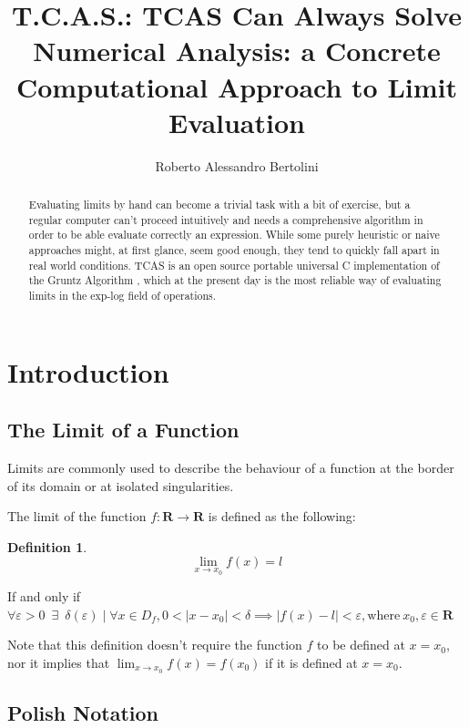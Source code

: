 \documentclass{article}
\title{\textbf{T.C.A.S.}: \textbf{T}CAS \textbf{C}an \textbf{A}lways \textbf{S}olve \\
	\large Numerical Analysis: a Concrete Computational Approach to Limit Evaluation}
\author{Roberto Alessandro Bertolini}
\date{}
\affil{Liceo Nervi Ferrari - Morbegno}
\theoremstyle{plain}
\theoremstyle{definition}
\newtheorem*{defn*}{Definition}
\theoremstyle{algorithm}
\begin{document}
	\maketitle
	
	\begin{abstract}
		Evaluating limits by hand can become a trivial task with a bit of exercise, but a regular computer can't proceed intuitively and needs a comprehensive algorithm in order to be able evaluate correctly an expression. 
		While some purely heuristic or naive approaches might, at first glance, seem good enough, they tend to quickly fall apart in real world conditions. TCAS is an open source portable universal C implementation of the Gruntz Algorithm \cite{gruntz}, which at the present day is the most reliable way of evaluating limits in the exp-log field of operations.
	\end{abstract}
	
	\tableofcontents
	
	\newpage	
	
	\section{Introduction}
	
	\subsection{The Limit of a Function}
	
	Limits are commonly used to describe the behaviour of a function at the border of its domain or at isolated singularities.
	
	The limit of the function $ f: \mathbf{R} \rightarrow \mathbf{R} $ is defined as the following:
	
	\begin{defn*}
		\[ 
		\lim_{x \to x_{0}}{f(x) = l} 
		\]
		
		If and only if \( 
		\forall \varepsilon > 0 \enspace \exists \enspace \delta(\varepsilon) \mid \forall x \in D_{f}, 0 < \mid x - x_{0} \mid < \delta \implies \mid f(x) - l \mid < \varepsilon, \text{where} \: x_{0}, \varepsilon \in \mathbf{R}
		\)
	\end{defn*}

	Note that this definition doesn't require the function \(f\) to be defined at \(x = x_{0}\), nor it implies that \(\lim_{x \to x_{0}}{f(x)} = f(x_{0})\) if it is defined at \(x = x_{0}\).
	
	\subsection{Polish Notation} \label{sec:pn}
	
\end{document}
